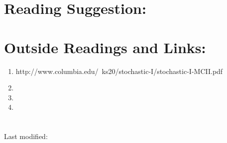 \documentclass[12pt]{article}
\begin{document}
\section*{Reading Suggestion:}




\hr

\section*{Outside Readings and Links:}
\begin{enumerate}
    \item
        http://www.columbia.edu/~ks20/stochastic-I/stochastic-I-MCII.pdf
    \item
    \item
    \item
\end{enumerate}

\section*{\solutionsname} \loadSolutions

\hr

\mydisclaim \myfooter

Last modified:  \flastmod
\end{document}
